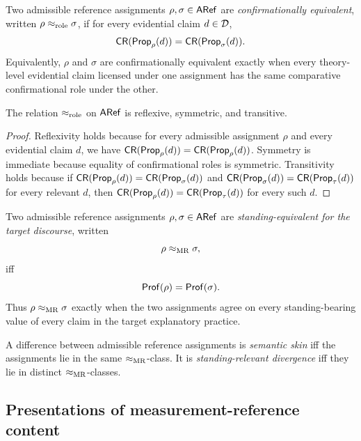 \begin{definition}
\label{def:confirmational-role-equivalence}
Two admissible reference assignments $\rho,\sigma\in\mathsf{ARef}$ are \emph{confirmationally equivalent},
written $\rho\mathrel{\approx_{\mathrm{role}}}\sigma$, if for every evidential claim $d\in\mathcal{D}$,
\[
\mathsf{CR}(\mathsf{Prop}_\rho(d)) = \mathsf{CR}(\mathsf{Prop}_\sigma(d)).
\]
Equivalently, $\rho$ and $\sigma$ are confirmationally equivalent exactly when every theory-level
evidential claim licensed under one assignment has the same comparative confirmational role under
the other.
\end{definition}

\begin{lemma}
\label{lem:role-equivalence-relation}
The relation $\mathrel{\approx_{\mathrm{role}}}$ on $\mathsf{ARef}$ is reflexive, symmetric, and transitive.
\end{lemma}

\begin{proof}
Reflexivity holds because for every admissible assignment $\rho$ and every evidential claim $d$, we
have $\mathsf{CR}(\mathsf{Prop}_\rho(d))=\mathsf{CR}(\mathsf{Prop}_\rho(d))$. Symmetry is immediate because equality of
confirmational roles is symmetric. Transitivity holds because if
$\mathsf{CR}(\mathsf{Prop}_\rho(d))=\mathsf{CR}(\mathsf{Prop}_\sigma(d))$ and
$\mathsf{CR}(\mathsf{Prop}_\sigma(d))=\mathsf{CR}(\mathsf{Prop}_\tau(d))$ for every relevant $d$, then
$\mathsf{CR}(\mathsf{Prop}_\rho(d))=\mathsf{CR}(\mathsf{Prop}_\tau(d))$ for every such $d$.
\end{proof}

\begin{definition}
\label{def:mr-standing-equivalence}
Two admissible reference assignments $\rho,\sigma\in\mathsf{ARef}$ are \emph{standing-equivalent for the
target discourse}, written
\[
\rho \mathrel{\approx_{\mathrm{MR}}} \sigma,
\]
iff
\[
\mathsf{Prof}(\rho)=\mathsf{Prof}(\sigma).
\]
Thus $\rho \mathrel{\approx_{\mathrm{MR}}} \sigma$ exactly when the two assignments agree on every standing-bearing value of
every claim in the target explanatory practice.
\end{definition}

\begin{definition}
\label{def:skin-vs-standing-divergence}
A difference between admissible reference assignments is \emph{semantic skin} iff the assignments lie
in the same $\mathrel{\approx_{\mathrm{MR}}}$-class. It is \emph{standing-relevant divergence} iff they lie in distinct $\mathrel{\approx_{\mathrm{MR}}}$-classes.
\end{definition}

\subsection{Presentations of measurement-reference content}


